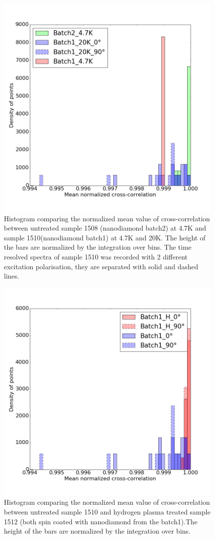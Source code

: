 \begin{figure}[h]
\centering
\includegraphics[width=0.7\linewidth]{"Figures/pic/Histogram of normalized cross-correlation_1_2"}
\caption{Histogram comparing the normalized mean value of cross-correlation between untreated sample 1508 (nanodiamond batch2) at 4.7K and sample 1510(nanodiamond batch1) at 4.7K and 20K. The height of the bars are normalized by the integration over bins. The time resolved spectra of sample 1510 was recorded with 2 different excitation polarisation, they are separated with solid and dashed lines.}
\label{fig:histogram-of-normalized-cross-correlation12}
\end{figure}
\begin{figure}[h]
\centering
\includegraphics[width=0.7\linewidth]{"Figures/pic/Histogram of normalized cross-correlation_1_H"}
\caption{Histogram comparing the normalized mean value of cross-correlation between untreated sample 1510 and hydrogen plasma treated sample 1512 (both spin coated with nanodiamond from the batch1).The height of the bars are normalized by the integration over bins.  }
\label{fig:histogram-of-normalized-cross-correlation1h}
\end{figure}
